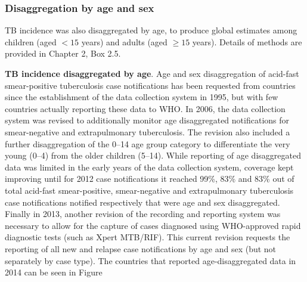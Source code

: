\subsubsection{Disaggregation by age and sex}

TB incidence was also disaggregated by age, to produce global estimates among children (aged $< 15$ years) and adults (aged $\geq 15$ years). Details of methods are provided in Chapter 2, Box 2.5.  

\textbf{TB incidence disaggregated by age}. Age and sex disaggregation of acid-fast smear-positive tuberculosis case notifications has been requested from countries since the establishment of the data collection system in 1995, but with few countries actually reporting these data to WHO. In 2006, the data collection system was revised to additionally monitor age disaggregated notifications for smear-negative and extrapulmonary tuberculosis. The revision also included a further disaggregation of the 0–14 age group category to differentiate the very young (0–4) from the older children (5–14). While reporting of age disaggregated data was limited in the early years of the data collection system, coverage kept improving until for 2012 case notifications it reached 99\%, 83\% and 83\% out of total acid-fast smear-positive, smear-negative and extrapulmonary tuberculosis case notifications notified respectively that were age and sex disaggregated. Finally in 2013, another revision of the recording and reporting system was necessary to allow for the capture of cases diagnosed using WHO-approved rapid diagnostic tests (such as Xpert MTB/RIF). This current revision requests the reporting of all new and relapse case notifications by age and sex (but not separately by case type). The countries that reported age-disaggregated data in 2014 can be seen in Figure 


